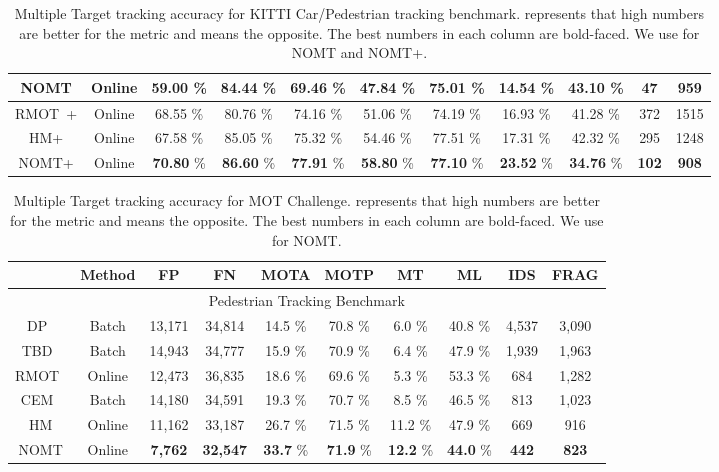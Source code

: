 \documentclass[10pt,twocolumn,letterpaper]{article}
\begin{document}
\begin{table*}
\begin{center}
{\begin{tabular}{| c || c || c | c | c || c | c | c | c | c | c |}
NOMT & Online & {\bf 59.00} \% & {\bf 84.44} \% & {\bf 69.46} \% & {\bf 47.84} \% & 75.01 \% & {\bf 14.54} \% & {\bf 43.10} \% & {\bf 47} & {\bf 959} \\
\hline
\hline
RMOT~\cite{YoonWACV2015}+\cite{wang2013regionlets} & Online & 68.55 \% & 80.76 \% & 74.16 \% & 51.06 \% & 74.19 \% & 16.93 \% & 41.28 \% & 372 & 1515 \\
\hline
HM+\cite{wang2013regionlets} & Online & 67.58 \% & 85.05 \% & 75.32 \% & 54.46  \% & 77.51 \% & 17.31 \% & 42.32 \% & 295 & 1248\\
NOMT+\cite{wang2013regionlets} & Online & {\bf 70.80} \% & {\bf 86.60} \% & {\bf 77.91} \% & {\bf 58.80}  \% & {\bf 77.10} \% & {\bf 23.52} \% & {\bf 34.76} \% & {\bf 102} & {\bf 908}\\
\hline
\end{tabular}
}
\caption{Multiple Target tracking accuracy for KITTI Car/Pedestrian tracking benchmark.  represents that high numbers are better for the metric and  means the opposite. The best numbers in each column are bold-faced. We use  for NOMT and NOMT+\cite{wang2013regionlets}.}
\label{tab:test}
\end{center}
 \end{table*}

\begin{table*}
\begin{center}
{\scriptsize
\begin{tabular}{| c || c || c | c || c | c | c | c | c | c |}
\hline
& Method & FP  & FN  & MOTA  & MOTP  & MT  & ML  & IDS  & FRAG  \\ 
\hline
\hline
\multicolumn{10}{|c|}{Pedestrian Tracking Benchmark} \\
\hline
DP~\cite{Pirsiavash_CVPR_11} & Batch & 13,171 & 34,814 & 14.5 \% & 70.8 \% & 6.0 \% & 40.8 \% & 4,537 & 3,090 \\
TBD~\cite{Geiger2014PAMI} & Batch & 14,943 & 34,777 & 15.9 \% & 70.9 \% & 6.4 \%	& 47.9 \% & 1,939 &	1,963 \\	
RMOT~\cite{YoonWACV2015} & Online & 12,473 & 36,835 & 18.6 \% & 69.6 \% & 5.3 \% & 53.3 \% & 684 & 1,282\\
CEM~\cite{Milan:2014:CEM} & Batch & 14,180 & 34,591 & 19.3 \% & 70.7 \% & 8.5 \% & 46.5 \% & 813 & 1,023 \\
\hline
HM & Online & 11,162 & 33,187 & 26.7 \% & 71.5 \% &  11.2 \% & 47.9 \% & 669 & 916 \\
NOMT & Online & {\bf 7,762} & {\bf 32,547} & {\bf 33.7} \% & {\bf 71.9} \% & {\bf 12.2} \% & {\bf 44.0} \% & {\bf 442} & {\bf 823} \\
\hline
\end{tabular}
}
\caption{Multiple Target tracking accuracy for MOT Challenge.  represents that high numbers are better for the metric and  means the opposite. The best numbers in each column are bold-faced. We use  for NOMT.}
\label{tab:mot}
\end{center} \end{table*}
\end{document}

